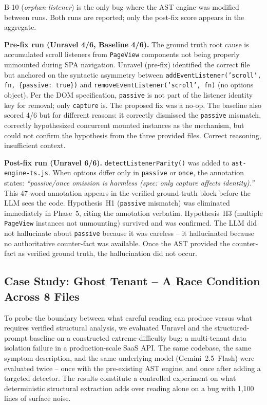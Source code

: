 \documentclass[12pt,a4paper]{article}
\newcommand{\code}[1]{\texttt{\small #1}}
\begin{document}
B-10 (\textit{orphan-listener}) is the only bug where the AST engine was modified
between runs. Both runs are reported; only the post-fix score appears in the aggregate.

\textbf{Pre-fix run (Unravel 4/6, Baseline 4/6).} The ground truth root cause is
accumulated scroll listeners from \code{PageView} components not being properly unmounted
during SPA navigation. Unravel (pre-fix) identified the correct file but anchored on the
syntactic asymmetry between \code{addEventListener('scroll', fn, \{passive:\ true\})} and
\code{removeEventListener('scroll', fn)} (no options object). Per the DOM specification,
\code{passive} is not part of the listener identity key for removal; only \code{capture}
is. The proposed fix was a no-op. The baseline also scored 4/6 but for different reasons:
it correctly dismissed the \code{passive} mismatch, correctly hypothesized concurrent
mounted instances as the mechanism, but could not confirm the hypothesis from the three
provided files. Correct reasoning, insufficient context.

\textbf{Post-fix run (Unravel 6/6).} \code{detectListenerParity()} was added to
\code{ast-engine-ts.js}. When options differ only in \code{passive} or \code{once}, the
annotation states: \textit{``passive/once omission is harmless (spec: only capture affects
identity).''} This 47-word annotation appears in the verified ground-truth block before the
LLM sees the code. Hypothesis~H1 (\code{passive} mismatch) was eliminated immediately in
Phase~5, citing the annotation verbatim. Hypothesis~H3 (multiple \code{PageView} instances
not unmounting) survived and was confirmed. The LLM did not hallucinate about
\code{passive} because it was careless -- it hallucinated because no authoritative
counter-fact was available. Once the AST provided the counter-fact as verified ground
truth, the hallucination did not occur.


\subsection{Case Study: Ghost Tenant -- A Race Condition Across 8 Files}
\label{sec:superbug}

To probe the boundary between what careful reading can produce versus what requires
verified structural analysis, we evaluated Unravel and the structured-prompt baseline
on a constructed extreme-difficulty bug: a multi-tenant data isolation failure in a
production-scale SaaS API. The same codebase, the same symptom description, and the
same underlying model (Gemini~2.5~Flash) were evaluated twice -- once with the
pre-existing AST engine, and once after adding a targeted detector. The results
constitute a controlled experiment on what deterministic structural extraction adds
over reading alone on a bug with 1,100 lines of surface noise.
\end{document}
